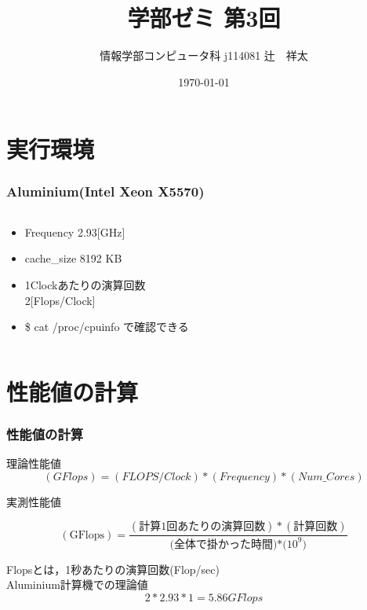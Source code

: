 \documentclass[dvipdfmx]{beamer}
\title[seminar 3rd]{学部ゼミ 第3回}
\institute{Kogakuin University}
\author[Shota Tsuji]{情報学部コンピュータ科 j114081 辻　祥太}
\date{\today}
\begin{document}
\begin{frame}
  \titlepage 
\end{frame} 

\section*{実行環境}
\begin{frame}
	\frametitle{Aluminium(Intel Xeon X5570)}
	\begin{columns}
	\begin{column}{0.48\textwidth}
	\begin{itemize}
		\item Frequency 2.93[GHz]
		\item cache\_size 8192 KB
		\item 1Clockあたりの演算回数\\ 2[Flops/Clock]
	\end{itemize}

	\begin{itemize}
		\item \$ cat /proc/cpuinfo で確認できる
	\end{itemize}
	\end{column}

	\end{columns}
\end{frame}

\section{性能値の計算}
\begin{frame}
  \frametitle{性能値の計算}
	\begin{block}{理論性能値}
	\begin{equation*}
		(GFlops) = (FLOPS/Clock) * (Frequency) * (Num\_Cores)
  \end{equation*}
	\end{block}

	\begin{block}{実測性能値}
	\begin{center}
  \begin{equation*}
		(\mbox{GFlops}) = \frac{(\mbox{計算1回あたりの演算回数})*(\mbox{計算回数})}{(\mbox{全体で掛かった時間)*($10^9$)}}
  \end{equation*}
	\end{center}
	\end{block}
	Flopsとは，1秒あたりの演算回数(Flop/sec)\\
	Aluminium計算機での理論値
	\begin{equation*}
		2 * 2.93 * 1 = 5.86GFlops
  \end{equation*}
\end{frame}
\end{document}
